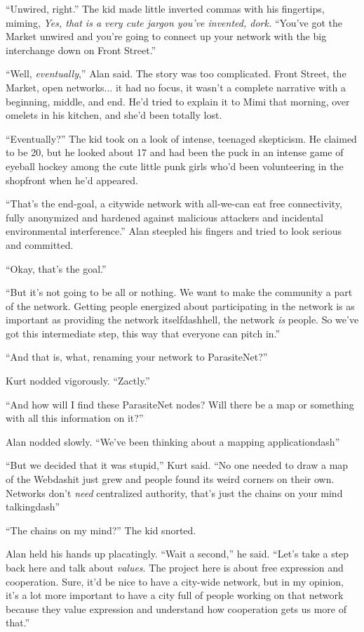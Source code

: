``Unwired, right.'' The kid made little inverted commas with his
fingertips, miming, \textit{Yes, that is a very cute jargon you've
invented, dork.} ``You've got the Market unwired and you're going to
connect up your network with the big interchange down on Front
Street.''

``Well, \textit{eventually},'' Alan said.  The story was too
complicated.  Front Street, the Market, open networks...  it had no
focus, it wasn't a complete narrative with a beginning, middle, and
end.  He'd tried to explain it to Mimi that morning, over omelets in
his kitchen, and she'd been totally lost.

``Eventually?'' The kid took on a look of intense, teenaged
skepticism.  He claimed to be 20, but he looked about 17 and had been
the puck in an intense game of eyeball hockey among the cute little
punk girls who'd been volunteering in the shopfront when he'd
appeared.

``That's the end-goal, a citywide network with all-we-can eat free
connectivity, fully anonymized and hardened against malicious
attackers and incidental environmental interference.'' Alan steepled
his fingers and tried to look serious and committed.

``Okay, that's the goal.''

``But it's not going to be all or nothing.  We want to make the
community a part of the network.  Getting people energized about
participating in the network is as important as providing the network
itselfdash{}hell, the network \textit{is} people.  So we've got this
intermediate step, this way that everyone can pitch in.''

``And that is, what, renaming your network to ParasiteNet?''

Kurt nodded vigorously.  ``Zactly.''

``And how will I find these ParasiteNet nodes?  Will there be a map or
something with all this information on it?''

Alan nodded slowly.  ``We've been thinking about a mapping
applicationdash{}''

``But we decided that it was stupid,'' Kurt said.  ``No one needed to
draw a map of the Webdash{}it just grew and people found its weird
corners on their own.  Networks don't \textit{need} centralized
authority, that's just the chains on your mind talkingdash{}''

``The chains on my mind?'' The kid snorted.

Alan held his hands up placatingly.  ``Wait a second,'' he said. 
``Let's take a step back here and talk about \textit{values}.  The
project here is about free expression and cooperation.  Sure, it'd be
nice to have a city-wide network, but in my opinion, it's a lot more
important to have a city full of people working on that network
because they value expression and understand how cooperation gets us
more of that.''

